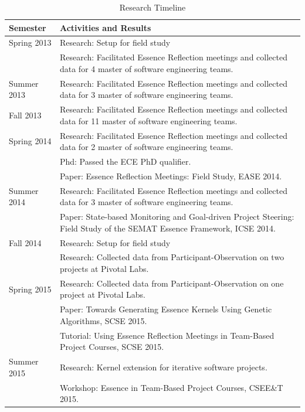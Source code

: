 \documentclass[preprint,12pt,3p]{elsarticle}
\begin{document}
\begin{table}[H]
\caption{Research Timeline}
\label{ResearchTimeline}
\centering
\begin{tabular}{|p{1.00in}|p{5.00in}|}
\hline
Semester    & Activities and Results  \\ \hline
Spring 2013 & Research: Setup for field study \\
            & Research: Facilitated Essence Reflection meetings and collected data for 4 master of software engineering teams. \\ \hline
Summer 2013 & Research: Facilitated Essence Reflection meetings and collected data for 3 master of software engineering teams.  \\ \hline
Fall 2013   & Research: Facilitated Essence Reflection meetings and collected data for 11 master of software engineering teams.  \\ \hline
Spring 2014 & Research: Facilitated Essence Reflection meetings and collected data for 2 master of software engineering teams.\\ 
            & Phd: Passed the ECE PhD qualifier.\\ 
            & Paper: Essence Reflection Meetings: Field Study, EASE 2014. \cite{EASE2014} \\ \hline
Summer 2014 & Research: Facilitated Essence Reflection meetings and collected data for 3 master of software engineering teams.\\ 
            & Paper: State-based Monitoring and Goal-driven Project Steering: Field Study of the SEMAT Essence Framework, ICSE 2014. \cite{ICSE2014} \\ \hline
Fall 2014   & Research: Setup for field study \\
            & Research: Collected data from Participant-Observation on two projects at Pivotal Labs.  \\ \hline
Spring 2015 & Research: Collected data from Participant-Observation on one project at Pivotal Labs.\\ 
            & Paper: Towards Generating Essence Kernels Using Genetic Algorithms, SCSE 2015. \cite{} \\ 
            & Tutorial: Using Essence Reflection Meetings in Team-Based Project Courses, SCSE 2015.\cite{} \\ \hline
Summer 2015 & Research: Kernel extension for iterative software projects.\\ 
            & Workshop: Essence in Team-Based Project Courses, CSEE\&T 2015. \cite{} \\ \hline                     
\end{tabular}
\end{table}
\end{document}
